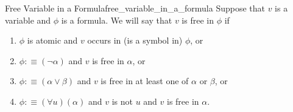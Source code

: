 \begin{definition}{Free Variable in a Formula}{free_variable_in_a_formula}
    Suppose that $v$ is a variable and $\phi$ is a formula. We will say that $v$ is free in $\phi$ if
    \begin{enumerate}
        \item $\phi$ is atomic and $v$ occurs in (is a symbol in) $\phi$, or                               
        \item $\phi: \equiv(\neg \alpha)$ and $v$ is free in $\alpha$, or
        \item $\phi: \equiv(\alpha \vee \beta)$ and $v$ is free in at least one of $\alpha$ or $\beta$, or
        \item $\phi: \equiv(\forall u)(\alpha)$ and $v$ is not $u$ and $v$ is free in $\alpha$.
    \end{enumerate}
\end{definition}
